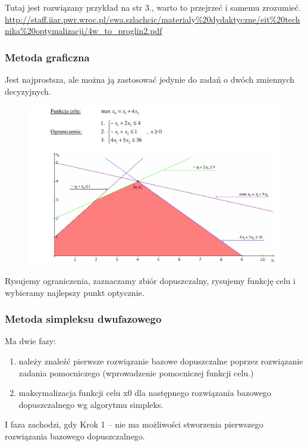 \documentclass[a4paper,twoside]{report}
\begin{document}
Tutaj jest rozwiązany przykład na str 3., warto to przejrzeć i samemu zrozumieć. 
\url{http://staff.iiar.pwr.wroc.pl/ewa.szlachcic/materialy\%20dydaktyczne/eit%20technika%20optymalizacji/4w_to_proglin2.pdf}
	
	\subsubsection{Metoda graficzna}  
	
	Jest najprostsza, ale można ją zastosować jedynie do zadań o dwóch zmiennych decyzyjnych. 
	
	\begin{figure}[H]
		\includegraphics[scale=0.7
		]{obrazy/optymalizacja/opt4.png}
	\end{figure} 
	
	Rysujemy ograniczenia, zaznaczamy zbiór dopuszczalny, rysujemy funkcję celu i wybieramy najlepszy punkt optycznie.
	
	
	\subsubsection{Metoda simpleksu dwufazowego}
	
	Ma dwie fazy:
	\begin{enumerate}
		\item należy znaleźć pierwsze rozwiązanie bazowe    dopuszczalne poprzez rozwiązanie zadania pomocniczego (wprowadzenie pomocniczej funkcji celu.)
		\item maksymalizacja funkcji celu x0 dla następnego rozwiązania bazowego dopuszczalnego wg algorytmu simpleks.
	\end{enumerate}
	
	I faza zachodzi, gdy Krok 1 – nie ma możliwości stworzenia pierwszego rozwiązania bazowego dopuszczalnego. 
	
\end{document}
